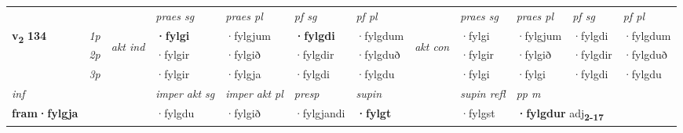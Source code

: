\begin{longtable}[l]{X>{\footnotesize\itshape}llXXXXlXXXX}
\midrule

 & &   & \textit{praes sg}  & \textit{praes pl}    & \textit{ pf sg} & \textit{pf pl} & & \textit{praes sg}  & \textit{praes pl}    & \textit{pf sg} & \textit{pf pl }  \\ \cmidrule{4-7} \cmidrule{9-12}
 \multirow{2}{*}{{{\textbf{v{\textsubscript{2}}} \Large{\textbf{134}}}}}  & 1p & \multirow{3}{*}{\begin{turn}{90}\textit{akt ind}\end{turn}} & \textbf{·fylgi} & ·fylgjum & \textbf{·fylgdi} & ·fylgdum & \multirow{3}{*}{\begin{turn}{90}\textit{akt con}\end{turn}} &·fylgi & ·fylgjum & ·fylgdi & ·fylgdum\\*
 & 2p &  &  ·fylgir  & ·fylgið & ·fylgdir & ·fylgduð & & ·fylgir & ·fylgið & ·fylgdir & ·fylgduð \\*
 & 3p &  & ·fylgir & ·fylgja & ·fylgdi & ·fylgdu & & ·fylgi & ·fylgi& ·fylgdi & ·fylgdu \\*
\cmidrule{4-7} \cmidrule{9-12}

   {\textit{inf}} & &  & \textit{imper akt sg} & \textit{imper akt pl}   & \textit{presp} & \textit{supin} && \textit{supin refl} & \textit{pp m} \\*
  {\textbf{fram\allowbreak ·fylgja}} & && ·fylgdu  & ·fylgið   & ·fylgjandi &  \textbf{·fylgt} && ·fylgst & \multicolumn{2}{l}{\textbf{·fylgdur} adj\textbf{\textsubscript{2-17}}} \\*

\midrule


\end{longtable}
